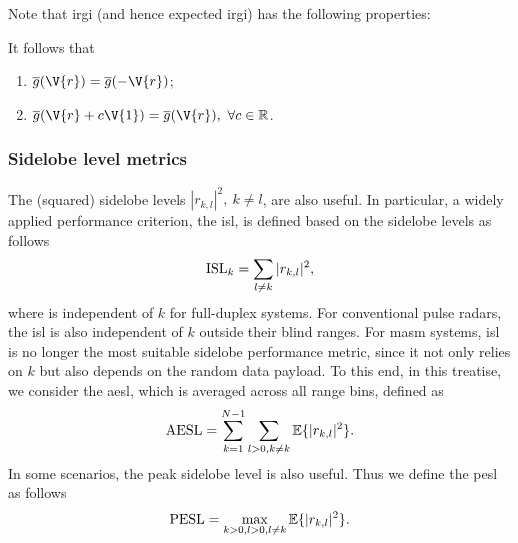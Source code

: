 \documentclass[journal,a4paper,10pt, romanappendices]{IEEEtran}
\begin{document}
Note that \ac{irgi} (and hence expected \ac{irgi}) has the following properties:
\begin{proposition}\label{prop:irgi_property}
It follows that
    \begin{enumerate}
    \item $\overline{g}(\V{r})=\overline{g}(-\V{r})$;
    \item $\overline{g}(\V{r}+c\V{1})=\overline{g}(\V{r}),~\forall c\in\mathbb{R}$.
\end{enumerate}
\end{proposition}

\subsubsection{Sidelobe level metrics}
The (squared) sidelobe levels $|r_{k,l}|^2,~k\neq l$, are also useful. In particular, a widely applied performance criterion, the \ac{isl}, is defined based on the sidelobe levels as follows
\begin{equation}\label{isl}
{\rm ISL}_k = \sum_{l\neq k}|r_{k,l}|^2,
\end{equation}
where is independent of $k$ for full-duplex systems. For conventional pulse radars, the \ac{isl} is also independent of $k$ outside their blind ranges. For \ac{masm} systems, \ac{isl} is no longer the most suitable sidelobe performance metric, since it not only relies on $k$ but also depends on the random data payload. To this end, in this treatise, we consider the \ac{aesl}, which is averaged across all range bins, defined as
\begin{equation}
{\rm AESL} = \sum_{k=1}^{N-1} \sum_{l>0,k\neq k} \mathbb{E}\{|r_{k,l}|^2\}.
\end{equation}
In some scenarios, the peak sidelobe level is also useful. Thus we define the \ac{pesl} as follows
\begin{equation}
{\rm PESL} = \max_{k>0,l>0,l\neq k} \mathbb{E}\{|r_{k,l}|^2\}.
\end{equation}
\end{document}
